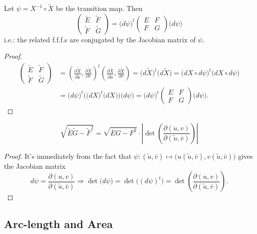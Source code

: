 \begin{proposition}
Let $\psi = X^{-1}\circ\tilde{X}$ be the transition map. Then
\[
\begin{pmatrix}\tilde{E} & \tilde{F}\\ \tilde{F} & \tilde{G}\end{pmatrix} = \big(d\psi\big)^t\begin{pmatrix}E & F\\ F & G\end{pmatrix}\big(d\psi\big)
\]
i.e.: the related f.f.f.s are conjugated by the Jacobian matrix of $\psi$.
\end{proposition}

\begin{proof}
\begin{align*}
\begin{pmatrix}\tilde{E} & \tilde{F}\\ \tilde{F} & \tilde{G}\end{pmatrix} &= \left(\frac{\partial\tilde{X}}{\partial\tilde{u}}, \frac{\partial\tilde{X}}{\partial\bar{v}}\right)^{\!\!t}\left(\frac{\partial\tilde{X}}{\partial\tilde{u}}, \frac{\partial\tilde{X}}{\partial\bar{v}}\right) = \big(d\tilde{X}\big)^t\big(d\tilde{X}\big) = \big(dX\circ d\psi\big)^t\big(dX\circ d\psi\big)\\
&= \big(d\psi\big)^t\Big(\big(dX\big)^t\big(dX\big)\Big)\big(d\psi\big) = \big(d\psi\big)^t\begin{pmatrix}E & F\\ F & G\end{pmatrix}\big(d\psi\big).
\end{align*}
\end{proof}

\begin{corollary}
\[
\sqrt{\tilde{E}\tilde{G} - \tilde{F}^2} = \sqrt{EG - F^2}\cdot\left|\det\left(\frac{\partial(u, v)}{\partial(\tilde{u}, \bar{v})}\right)\right|
\]
\end{corollary}

\begin{proof}
It's immediately from the fact that $\psi: (\tilde{u}, \bar{v})\mapsto\big(u(\tilde{u}, \bar{v}), v(\tilde{u}, \bar{v})\big)$ gives the Jacobian matrix
\[
d\psi = \frac{\partial(u, v)}{\partial(\tilde{u}, \bar{v})} \Rightarrow \det\big(d\psi\big) = \det\big((d\psi)^t\big) = \det\left(\frac{\partial(u, v)}{\partial(\tilde{u}, \bar{v})}\right).
\]
\end{proof}

\subsection{Arc-length and Area}

